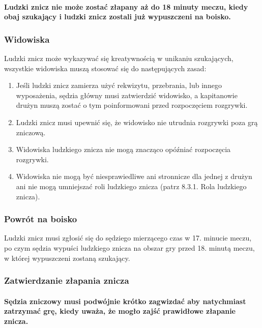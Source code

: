 \documentclass[12pt]{article}
\begin{document}
\paragraph{Ludzki znicz nie może zostać złapany aż do 18 minuty
meczu, kiedy obaj szukający i ludzki znicz zostali już wypuszczeni na
boisko.}

\subsubsection{Widowiska}

Ludzki znicz może wykazywać się kreatywnością w unikaniu szukających,
wszystkie widowiska muszą stosować się do następujących zasad:

\begin{enumerate}
\item
  Jeśli ludzki znicz zamierza użyć rekwizytu, przebrania, lub innego
  wyposażenia, sędzia główny musi zatwierdzić widowisko, a kapitanowie
  drużyn muszą zostać o tym poinformowani przed rozpoczęciem rozgrywki.
\item
  Ludzki znicz musi upewnić się, że widowisko nie utrudnia rozgrywki
  poza grą zniczową.
\item
  Widowiska ludzkiego znicza nie mogą znacząco opóźniać rozpoczęcia
  rozgrywki.
\item
  Widowiska nie mogą być niesprawiedliwe ani stronnicze dla jednej z
  drużyn ani nie mogą umniejszać roli ludzkiego znicza (patrz 8.3.1.
  Rola ludzkiego znicza).
\end{enumerate}

\subsubsection{Powrót na boisko}

Ludzki znicz musi zgłosić się do sędziego mierzącego czas w 17. minucie
meczu, po czym sędzia wypuści ludzkiego znicza na obszar gry przed 18.
minutą meczu, w której wypuszczeni zostaną szukający.

\subsubsection{Zatwierdzanie złapania znicza}

\paragraph{Sędzia zniczowy musi podwójnie krótko zagwizdać aby
natychmiast zatrzymać grę, kiedy uważa, że mogło zajść prawidłowe
złapanie znicza.}
\end{document}
